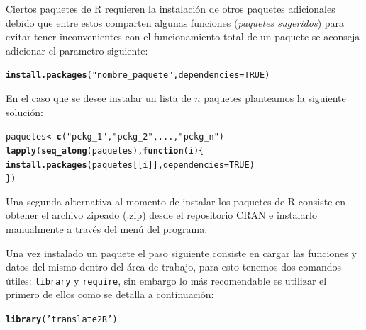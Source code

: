 \documentclass[11pt,a4paper,oneside]{book}\usepackage[]{graphicx}\usepackage[]{color}
\makeatletter
\newcommand{\hlnum}[1]{\textcolor[rgb]{0.686,0.059,0.569}{#1}}%
\newcommand{\hlstr}[1]{\textcolor[rgb]{0.192,0.494,0.8}{#1}}%
\newcommand{\hlstd}[1]{\textcolor[rgb]{0.345,0.345,0.345}{#1}}%
\newcommand{\hlkwa}[1]{\textcolor[rgb]{0.161,0.373,0.58}{\textbf{#1}}}%
\newcommand{\hlkwb}[1]{\textcolor[rgb]{0.69,0.353,0.396}{#1}}%
\newcommand{\hlkwc}[1]{\textcolor[rgb]{0.333,0.667,0.333}{#1}}%
\newcommand{\hlkwd}[1]{\textcolor[rgb]{0.737,0.353,0.396}{\textbf{#1}}}%
\newenvironment{kframe}{%
 \def\at@end@of@kframe{}%
 \ifinner\ifhmode%
  \def\at@end@of@kframe{\end{minipage}}%
  \begin{minipage}{\columnwidth}%
 \fi\fi%
 \def\FrameCommand##1{\hskip\@totalleftmargin \hskip-\fboxsep
 \colorbox{shadecolor}{##1}\hskip-\fboxsep
     \hskip-\linewidth \hskip-\@totalleftmargin \hskip\columnwidth}%
 \MakeFramed {\advance\hsize-\width
   \@totalleftmargin\z@ \linewidth\hsize
   \@setminipage}}%
 {\par\unskip\endMakeFramed%
 \at@end@of@kframe}
\newenvironment{knitrout}{}{} %
\makeatother
\begin{document}
\begin{itemize}
Ciertos paquetes de R requieren la instalación de otros paquetes adicionales debido que entre estos comparten algunas funciones (\emph{paquetes sugeridos}) para evitar tener inconvenientes con el funcionamiento total de un paquete se aconseja adicionar el parametro siguiente: 
\begin{knitrout}
\color{fgcolor}\begin{kframe}
\begin{alltt}
\hlkwd{install.packages}\hlstd{(}\hlstr{"nombre_paquete"}\hlstd{,} \hlkwc{dependencies}\hlstd{=}\hlnum{TRUE}\hlstd{)}
\end{alltt}
\end{kframe}
\end{knitrout}
En el caso que se desee instalar un lista de $n$ paquetes planteamos la siguiente solución:
\begin{knitrout}
\color{fgcolor}\begin{kframe}
\begin{alltt}
\hlstd{paquetes} \hlkwb{<-} \hlkwd{c}\hlstd{(}\hlstr{"pckg_1"}\hlstd{,}\hlstr{"pckg_2"}\hlstd{, ... ,} \hlstr{"pckg_n"}\hlstd{)}
\hlkwd{lapply}\hlstd{(}\hlkwd{seq_along}\hlstd{(paquetes),} \hlkwa{function}\hlstd{(}\hlkwc{i}\hlstd{)\{}
      \hlkwd{install.packages}\hlstd{(paquetes[[i]],} \hlkwc{dependencies}\hlstd{=}\hlnum{TRUE}\hlstd{)}
      \hlstd{\})}
\end{alltt}
\end{kframe}
\end{knitrout}

Una segunda alternativa al momento de instalar los paquetes de R consiste en obtener el archivo zipeado (.zip) desde el repositorio CRAN e instalarlo manualmente a través del menú del programa.\newline

Una vez instalado un paquete el paso siguiente consiste en cargar las funciones y datos del mismo dentro del área de trabajo, para esto tenemos dos comandos útiles: \texttt{library} y \texttt{require}, sin embargo lo más recomendable es utilizar el primero de ellos como se detalla a continuación:

\begin{knitrout}
\color{fgcolor}\begin{kframe}
\begin{alltt}
\hlkwd{library}\hlstd{(}\hlstr{'translate2R'}\hlstd{)}


\end{alltt}
\end{kframe}
\end{knitrout}
\end{itemize}
\end{document}
